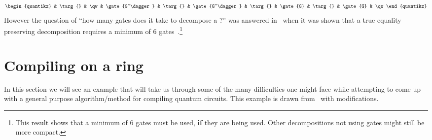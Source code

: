 \begin{example}
\begin{equation}
\begin{quantikz}
            & \targ{}  & \qw                                       & \gate{G^\dagger} & \targ{}  & \gate{G^\dagger} & \targ{}  & \gate{G} & \targ{}  & \gate{G} & \qw
        \end{quantikz}
    \end{equation}
    However the question of ``how many \CNOT{} gates does it take to decompose a \CCNOT{}?'' was answered in~\citeyear{toff3cnot} when it was shown that a true equality preserving decomposition requires a minimum of 6 \CNOT{} gates~\cite{toff3cnot}.\footnote{This result shows that a minimum of 6 \CNOT{} gates must be used, \textbf{if} they are being used. Other decompositions not using \CNOT{} gates might still be more compact.}
\end{example}


\section{Compiling on a ring}\label{sec:ringcomp}

In this section we will see an example that will take us through some of the many difficulties one might face while attempting to come up with a general purpose algorithm/method for compiling quantum circuits.
This example is drawn from~\cite{ring-compilation} with modifications.

